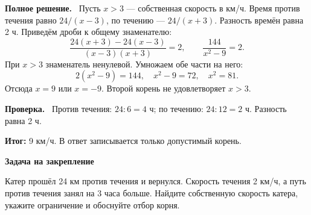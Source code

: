 \documentclass[a4paper,12pt]{article}
\newcommand{\parthead}[1]{\par\textbf{#1.}\ }
\newcommand{\result}[1]{\par\textcolor{darkaccent}{\textbf{Итог:}} #1\par}
\newcommand{\practice}[1]{\par\medskip\textcolor{accent}{\textbf{Задача на закрепление}}\par #1}
\begin{document}
\parthead{Полное решение} Пусть $x>3$ --- собственная скорость в км/ч. Время против течения равно $24/(x-3)$, по течению --- $24/(x+3)$. Разность времён равна 2 ч. Приведём дроби к общему знаменателю:
\[\frac{24(x+3)-24(x-3)}{(x-3)(x+3)}=2,\qquad \frac{144}{x^2-9}=2.\]
При $x>3$ знаменатель ненулевой. Умножаем обе части на него:
\[2(x^2-9)=144,\quad x^2-9=72,\quad x^2=81.\]
Отсюда $x=9$ или $x=-9$. Второй корень не удовлетворяет $x>3$.
\parthead{Проверка} Против течения: $24:6=4$ ч; по течению: $24:12=2$ ч. Разность равна 2 ч.
\result{9 км/ч. В ответ записывается только допустимый корень.}
\practice{Катер прошёл 24 км против течения и вернулся. Скорость течения 2 км/ч, а путь против течения занял на 3 часа больше. Найдите собственную скорость катера, укажите ограничение и обоснуйте отбор корня.}
\end{document}
